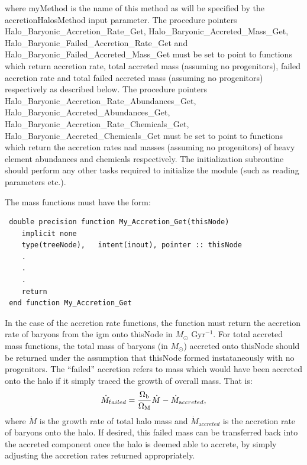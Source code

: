 where {\normalfont \ttfamily myMethod} is the name of this method as will be specified by the {\normalfont \ttfamily accretionHalosMethod} input parameter. The procedure pointers {\normalfont \ttfamily Halo\_Baryonic\_Accretion\_Rate\_Get}, {\normalfont \ttfamily Halo\_Baryonic\_Accreted\_Mass\_Get}, {\normalfont \ttfamily Halo\_Baryonic\_Failed\_Accretion\_Rate\_Get} and {\normalfont \ttfamily Halo\_Baryonic\_Failed\_Accreted\_Mass\_Get} must be set to point to functions which return accretion rate, total accreted mass (assuming no progenitors), failed accretion rate and total failed accreted mass (assuming no progenitors) respectively as described below. The procedure pointers {\normalfont \ttfamily Halo\_Baryonic\_Accretion\_Rate\_Abundances\_Get}, {\normalfont \ttfamily Halo\_Baryonic\_Accreted\_Abundances\_Get}, {\normalfont \ttfamily Halo\_Baryonic\_Accretion\_Rate\_Chemicals\_Get}, {\normalfont \ttfamily Halo\_Baryonic\_Accreted\_Chemicals\_Get} must be set to point to functions which return the accretion rates nad masses (assuming no progenitors) of heavy element abundances and chemicals respectively. The initialization subroutine should perform any other tasks required to 
initialize the module (such as reading parameters etc.).

The mass functions must have the form:
\begin{verbatim}
 double precision function My_Accretion_Get(thisNode)
    implicit none
    type(treeNode),   intent(inout), pointer :: thisNode
    .
    .
    .
    return
 end function My_Accretion_Get
\end{verbatim}
In the case of the accretion rate functions, the function must return the accretion rate of baryons from the \gls{igm} onto {\normalfont \ttfamily thisNode} in $M_\odot$ Gyr$^{-1}$. For total accreted mass functions, the total mass of baryons (in $M_\odot$) accreted onto {\normalfont \ttfamily thisNode} should be returned under the assumption that {\normalfont \ttfamily thisNode} formed instataneously with no progenitors. The ``failed'' accretion refers to mass which would have been accreted onto the halo if it simply traced the growth of overall mass. That is:
\begin{equation}
 \dot{M}_{\mathrm failed} = {\Omega_{\mathrm b} \over \Omega_{\mathrm M}} \dot{M} - \dot{M}_{\mathrm accreted},
\end{equation}
where $\dot{M}$ is the growth rate of total halo mass and $\dot{M}_{\mathrm accreted}$ is the accretion rate of baryons onto the halo. If desired, this failed mass can be transferred back into the accreted component once the halo is deemed able to accrete, by simply adjusting the accretion rates returned appropriately.

